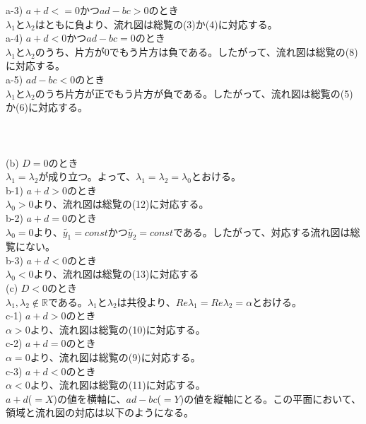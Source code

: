 \documentclass[pdflatex,ja=standard,fleqn]{bxjsarticle}
\begin{document}
\quad a-3) $a+d<=0$かつ$ad-bc>0$のとき\\
\quad\quad$\lambda_{1}$と$\lambda_{2}$はともに負より、流れ図は総覧の(3)か(4)に対応する。\\
\quad a-4) $a+d<0$かつ$ad-bc=0$のとき\\
\quad\quad$\lambda_{1}$と$\lambda_{2}$のうち、片方が$0$でもう片方は負である。したがって、流れ図は総覧の(8)に対応する。\\
\quad a-5) $ad-bc<0$のとき\\
\quad\quad$\lambda_{1}$と$\lambda_{2}$のうち片方が正でもう片方が負である。したがって、流れ図は総覧の(5)か(6)に対応する。\\\\\\\\
(b) $D=0$のとき\\
\quad$\lambda_{1}=\lambda_{2}$が成り立つ。よって、$\lambda_{1}=\lambda_{2}=\lambda_{0}$とおける。\\
\quad b-1) $a+d>0$のとき\\
\quad\quad$\lambda_{0}>0$より、流れ図は総覧の(12)に対応する。\\
\quad b-2) $a+d=0$のとき\\
\quad\quad$\lambda_{0}=0$より、$\tilde{y_{1}}=const$かつ$\tilde{y_{2}}=const$である。したがって、対応する流れ図は総覧にない。\\
\quad b-3) $a+d<0$のとき\\
\quad\quad$\lambda_{0}<0$より、流れ図は総覧の(13)に対応する\\
(c) $D<0$のとき\\
\quad$\lambda_{1}, \lambda_{2} \notin \mathbb{R}$である。$\lambda_{1}$と$\lambda_{2}$は共役より、$Re\lambda_{1}=Re\lambda_{2}=\alpha$とおける。\\
\quad c-1) $a+d>0$のとき\\
\quad\quad$\alpha>0$より、流れ図は総覧の(10)に対応する。\\
\quad c-2) $a+d=0$のとき\\
\quad\quad$\alpha=0$より、流れ図は総覧の(9)に対応する。\\
\quad c-3) $a+d<0$のとき\\
\quad\quad$\alpha<0$より、流れ図は総覧の(11)に対応する。\\
$a+d$($=X$)の値を横軸に、$ad-bc$($=Y$)の値を縦軸にとる。この平面において、領域と流れ図の対応は以下のようになる。
\end{document}
